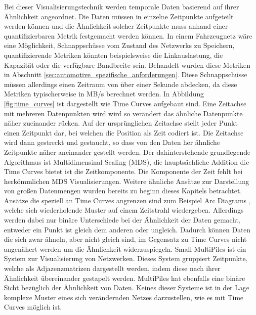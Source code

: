\documentclass[draft=false
              ,paper=a4
              ,twoside=false
              ,fontsize=11pt
              ,headsepline
              ,BCOR10mm
              ,DIV11
              ]{scrbook}
\begin{document}
Bei dieser Visualisierungstechnik werden temporale Daten basierend auf ihrer Ähnlichkeit angeordnet. Die Daten müssen in einzelne Zeitpunkte aufgeteilt werden können und die Ähnlichkeit solcher Zeitpunkte muss anhand einer quantifizierbaren Metrik festgemacht werden können. In einem Fahrzeugnetz wäre eine Möglichkeit, Schnappschüsse vom Zustand des Netzwerks zu Speichern, quantifizierende Metriken könnten beispielsweise die Linkauslastung, die Kapazität oder die verfügbare Bandbreite sein. Behandelt wurden diese Metriken in Abschnitt \ref{sec:automotive_spezifische_anforderungen}. Diese Schnappschüsse müssen allerdings einen Zeitraum von über einer Sekunde abdecken, da diese Metriken typischerweise in MB/s berechnet werden. In Abbildung \ref{fig:time_curves} ist dargestellt wie Time Curves aufgebaut sind. Eine Zeitachse mit mehreren Datenpunkten wird wird so verändert das ähnliche Datenpunkte näher zueinander rücken. Auf der ursprünglichen Zeitachse stellt jeder Punkt einen Zeitpunkt dar, bei welchen die Position als Zeit codiert ist. Die Zeitachse wird dann gestreckt und gestaucht, so dass von den Daten her ähnliche Zeitpunkte näher aneinander gestellt werden. Der dahinterstehende grundlegende Algorithmus ist Multidimensinal Scaling (MDS), die hauptsächliche Addition die Time Curves bietet ist die Zeitkomponente. Die Komponente der Zeit fehlt bei herkömmlichen MDS Visualisierungen.
Weitere ähnliche Ansätze zur Darstellung von großen Datenmengen wurden bereits zu beginn dieses Kapitels betrachtet. Ansätze die speziell an Time Curves angrenzen sind zum Beispiel Arc Diagrams \cite{wattenberg_arc_2002}, welche sich wiederholende Muster auf einem Zeitstrahl wiedergeben. Allerdings werden dabei nur binäre Unterschiede bei der Ähnlichkeit der Daten gemacht, entweder ein Punkt ist gleich dem anderen oder ungleich. Dadurch können Daten die sich zwar ähneln, aber nicht gleich sind, im Gegensatz zu Time Curves nicht angenähert werden um die Ähnlichkeit widerzuspiegeln. Small MultiPiles \cite{bach_small_2015} ist ein System zur Visualisierung von Netzwerken. Dieses System gruppiert Zeitpunkte, welche als Adjazenzmatrizen dargestellt werden, indem diese nach ihrer Ähnlichkeit übereinander gestapelt werden. MultiPiles hat ebenfalls eine binäre Sicht bezüglich der Ähnlichkeit von Daten. Keines dieser Systeme ist in der Lage komplexe Muster eines sich verändernden Netzes darzustellen, wie es mit Time Curves möglich ist. %
\end{document}
